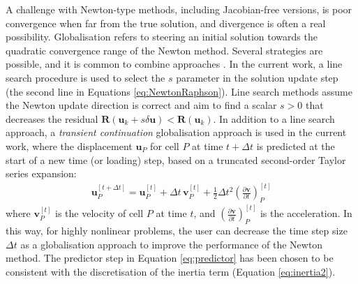 \documentclass[sn-mathphys,Numbered]{sn-jnl}%
\newcommand{\bb}{\boldsymbol}
\begin{document}
A challenge with Newton-type methods, including Jacobian-free versions, is poor convergence when far from the true solution, and divergence is often a real possibility.
Globalisation refers to steering an initial solution towards the quadratic convergence range of the Newton method.
Several strategies are possible, and it is common to combine approaches \cite{Knoll2004}.
In the current work, a line search procedure is used to select the $s$ parameter in the solution update step (the second line in Equations \ref{eq:NewtonRaphson}).
Line search methods assume the Newton update direction is correct and aim to find a scalar $s > 0$ that decreases the residual $\bb{R}(\bb{u}_k + s \delta \bb{u}) < \bb{R}(\bb{u}_k)$.
In addition to a line search approach, a \emph{transient continuation} globalisation approach is used in the current work, where the displacement $\bb{u}_P$ for cell $P$ at time $t + \Delta t$ is predicted at the start of a new time (or loading) step, based on a truncated second-order Taylor series expansion:
\begin{eqnarray} \label{eq:predictor}
	\bb{u}^{[t+\Delta t]}_P = \bb{u}^{[t]}_P + \Delta t \, \bb{v}^{[t]}_P + \frac{1}{2} \Delta t^2 \left( \frac{\partial \bb{v}}{\partial t} \right)^{[t]}_P
\end{eqnarray}
where $\bb{v}^{[t]}_P$ is the velocity of cell $P$ at time $t$, and $\left( \frac{\partial \bb{v}}{\partial t} \right)^{[t]}_P$ is the acceleration.
In this way, for highly nonlinear problems, the user can decrease the time step size $\Delta t$ as a globalisation approach to improve the performance of the Newton method.
The predictor step in Equation \ref{eq:predictor} has been chosen to be consistent with the discretisation of the inertia term (Equation \ref{eq:inertia2}).
\end{document}
